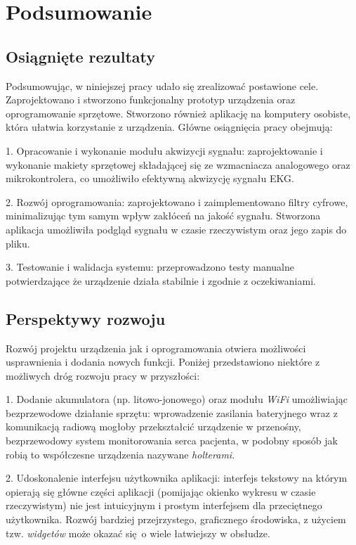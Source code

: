 
\chapter*{Podsumowanie}

\section{Osiągnięte rezultaty}

Podsumowując, w niniejszej pracy udało się zrealizować postawione cele.
Zaprojektowano i stworzono funkcjonalny prototyp urządzenia oraz oprogramowanie sprzętowe.
Stworzono również aplikację na komputery osobiste, która ułatwia korzystanie z urządzenia.
Główne osiągnięcia pracy obejmują:

1. Opracowanie i wykonanie modułu akwizycji sygnału: zaprojektowanie i wykonanie
makiety sprzętowej składającej się ze wzmacniacza analogowego oraz mikrokontrolera,
co umożliwiło efektywną akwizycję sygnału EKG.

2. Rozwój oprogramowania:
zaprojektowano i zaimplementowano filtry cyfrowe, minimalizując tym samym wpływ zakłóceń 
na jakość sygnału. Stworzona aplikacja umożliwiła podgląd sygnału w czasie rzeczywistym
oraz jego zapis do pliku.

3. Testowanie i walidacja systemu:
przeprowadzono testy manualne potwierdzające że urządzenie działa stabilnie i zgodnie
z oczekiwaniami.

\section{Perspektywy rozwoju}

Rozwój projektu urządzenia jak i oprogramowania otwiera możliwości usprawnienia i dodania 
nowych funkcji. Poniżej przedstawiono niektóre z możliwych dróg rozwoju pracy w przyszłości:

1. Dodanie akumulatora (np. litowo-jonowego) oraz modułu \textit{WiFi} umożliwiając 
bezprzewodowe działanie sprzętu: wprowadzenie zasilania bateryjnego wraz z komunikacją
radiową mogłoby przekształcić urządzenie w przenośny, bezprzewodowy system monitorowania
serca pacjenta, w podobny sposób jak robią to współczesne urządzenia nazywane \textit{holterami}.

2. Udoskonalenie interfejsu użytkownika aplikacji: interfejs tekstowy na którym opierają się 
główne części aplikacji (pomijając okienko wykresu w czasie rzeczywistym) 
nie jest intuicyjnym i prostym interfejsem dla przeciętnego użytkownika.
Rozwój bardziej przejrzystego, graficznego środowiska, z użyciem tzw. \textit{widgetów}
może okazać się o wiele łatwiejszy w obsłudze.


